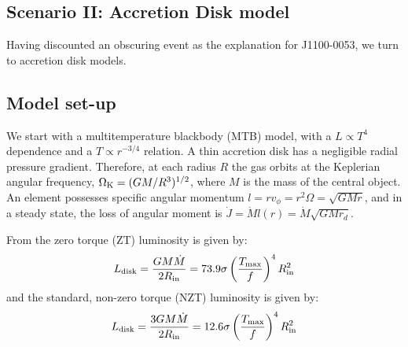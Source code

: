 \documentclass[11pt,a4paper]{article}
\begin{document}

\subsection*{Scenario II: Accretion Disk model}
Having discounted an obscuring event as the explanation for
J1100-0053, we turn to accretion disk models.

\subsection{Model set-up}
We start with a multitemperature blackbody (MTB) model, with a $L \propto T^4$ dependence and a $T \propto r^{-3/4}$ relation. A thin accretion disk has a negligible radial pressure gradient. Therefore, at each radius $R$ the gas orbits at the Keplerian angular frequency, $\Omega_{\rm K} = (GM/R^{3})^{1/2}$, where $M$ is the mass of the central object.  An element possesses specific angular momentum $l = r v_{\phi} = r^{2} \Omega = \sqrt{GMr}$, and in a steady state, the loss of angular moment is $\dot{J} = \dot{M} l(r) = \dot{M} \sqrt{GMr_{d}}$.



From \cite{Zimmerman2005} the zero torque (ZT) luminosity is given by:
\begin{equation}
L_{\rm disk}   =  \frac{G M \dot{M}}  {2 R_{\rm in}}    = 73.9 \sigma\left ( \frac{T_{\rm max}}{f}  \right )^{4}  R^{2}_{\rm in} 
\end{equation}
and the standard, non-zero torque (NZT) luminosity is given by:
\begin{equation}
L_{\rm disk} = \frac{3 G M \dot{M}}  {2 R_{\rm in}}    = 12.6 \sigma\left ( \frac{T_{\rm max}}{f}  \right )^{4}  R^{2}_{\rm in} 
\end{equation} 
\end{document}
